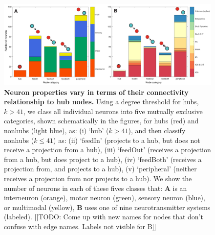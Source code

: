 \documentclass[10pt,letterpaper]{article}
\begin{document}
\begin{figure}[h]
\centering
    \includegraphics[width=1\textwidth]{FeedInOutNodesJustTwo.pdf}
\caption{
\textbf{Neuron properties vary in terms of their connectivity relationship to hub nodes.}
Using a degree threshold for hubs, $k > 41$, we class all individual neurons into five mutually exclusive categories, shown schematically in the figures, for hubs (red) and nonhubs (light blue), as:
(i) `hub' ($k>41$),
and then classify nonhubs ($k\leq41$) as:
(ii) `feedIn' (projects to a hub, but does not receive a projection from a hub),
(iii) `feedOut' (receives a projection from a hub, but does project to a hub),
(iv) `feedBoth' (receives a projection from, and projects to a hub),
(v) `peripheral' (neither receives a projection from nor projects to a hub).
We show the number of neurons in each of these fives classes that:
\textbf{A} is an interneuron (orange), motor neuron (green), sensory neuron (blue), or multimodal (yellow),
\textbf{B} uses one of nine neurotransmitter systems (labeled).
\label{fig:S_feedInOutNodes}
[[TODO: Come up with new names for nodes that don't confuse with edge names. Labels not visible for B]]
}
\end{figure}


\end{document}
